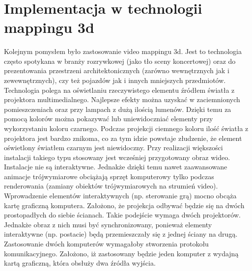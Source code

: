 \section{Implementacja w technologii mappingu 3d}
\paragraph{}
Kolejnym pomysłem było zastosowanie video mappingu 3d. Jest to technologia często spotykana w branży rozrywkowej (jako tło sceny koncertowej) oraz do prezentowania przestrzeni architektonicznych (zarówno wewnętrznych jak i zewewnętrznych), czy też pojazdów jak i innych mniejszych przedmiotów. 
\newline
Technologia polega na oświetlaniu rzeczywistego elementu  źródłem światła z projektora multimedialnego. Najlepsze efekty można uzyskać w zaciemnionych pomieszczeniach oraz przy lampach z dużą ilością lumenów. Dzięki temu za pomocą kolorów można pokazywać lub uniewidoczniać elementy przy wykorzystaniu koloru czarnego. Podczas projekcji ciemnego koloru ilość światła z projektora jest bardzo znikoma, co za tym idzie powstaje złudzenie, że element oświetlony światłem czarnym jest niewidoczny.
\newline
Przy realizacji większości instalacji takiego typu stosowany jest wcześniej przygotowany obraz wideo. Instalacje nie są interaktywne. Jednakże dzięki temu nawet zaawansowane animacje trójwymiarowe obciążają sprzęt komputerowy tylko podczas renderowania (zamiany obiektów trójwymiarowych na strumień video). Wprowadzenie elementów interaktywnych (np. sterowanie grą) mocno obcąża kartę graficzną komputera.
\newline
Założono, że projekcja odbywać będzie się na dwóch prostopadłych do siebie ścianach. Takie podejście wymaga dwóch projektorów. Jednakże obraz z nich musi być synchronizowany, ponieważ elementy interaktywne (np. postacie) będą przemieszczały się z jednej ściany na drugą. Zastosowanie dwóch komputerów wymagałoby stworzenia protokołu komunikacyjnego. Założono, iż zastosowany będzie jeden komputer z wydajną kartą graficzną, która obsłuży dwa źródła wyjścia.
